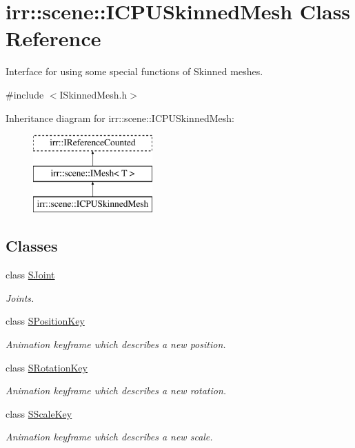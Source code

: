 \hypertarget{classirr_1_1scene_1_1ICPUSkinnedMesh}{}\section{irr\+:\+:scene\+:\+:I\+C\+P\+U\+Skinned\+Mesh Class Reference}
\label{classirr_1_1scene_1_1ICPUSkinnedMesh}


Interface for using some special functions of Skinned meshes.  




{\ttfamily \#include $<$I\+Skinned\+Mesh.\+h$>$}

Inheritance diagram for irr\+:\+:scene\+:\+:I\+C\+P\+U\+Skinned\+Mesh\+:\begin{figure}[H]
\begin{center}
\leavevmode
\includegraphics[height=3.000000cm]{classirr_1_1scene_1_1ICPUSkinnedMesh}
\end{center}
\end{figure}
\subsection*{Classes}
\begin{DoxyCompactItemize}
\item 
class \hyperlink{classirr_1_1scene_1_1ICPUSkinnedMesh_1_1SJoint}{S\+Joint}
\begin{DoxyCompactList}\small\item\em Joints. \end{DoxyCompactList}\item 
class \hyperlink{classirr_1_1scene_1_1ICPUSkinnedMesh_1_1SPositionKey}{S\+Position\+Key}
\begin{DoxyCompactList}\small\item\em Animation keyframe which describes a new position. \end{DoxyCompactList}\item 
class \hyperlink{classirr_1_1scene_1_1ICPUSkinnedMesh_1_1SRotationKey}{S\+Rotation\+Key}
\begin{DoxyCompactList}\small\item\em Animation keyframe which describes a new rotation. \end{DoxyCompactList}\item 
class \hyperlink{classirr_1_1scene_1_1ICPUSkinnedMesh_1_1SScaleKey}{S\+Scale\+Key}
\begin{DoxyCompactList}\small\item\em Animation keyframe which describes a new scale. \end{DoxyCompactList}\end{DoxyCompactItemize}
